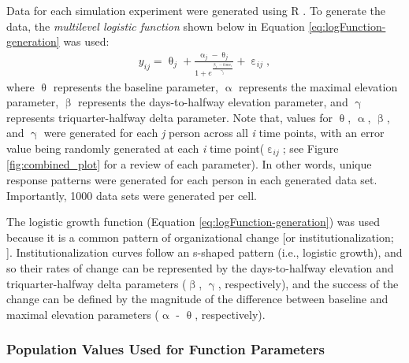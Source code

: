\documentclass[
12pt, %
twoside,
english]{guelphthesis}
\begin{document}
Data for each simulation experiment were generated using R \autocite{rstudio}. To generate the data, the \emph{multilevel logistic function} shown below in Equation \eqref{eq:logFunction-generation} was used:
\begin{align}
  y_{ij} = \uptheta_j + \frac{\upalpha_j - \uptheta_j}{{1 + e^\frac{\upbeta_j - time_i}{\upgamma_j}}} + \upepsilon_{ij}, 
\label{eq:logFunction-generation}
\end{align}
\noindent where \(\uptheta\) represents the baseline parameter, \(\upalpha\) represents the maximal elevation parameter, \(\upbeta\) represents the days-to-halfway elevation parameter, and \(\upgamma\) represents triquarter-halfway delta parameter. Note that, values for \(\uptheta\), \(\upalpha\), \(\upbeta\), and \(\upgamma\) were generated for each \emph{j} person across all \emph{i} time points, with an error value being randomly generated at each \emph{i} time point(\(\upepsilon_{ij}\); see Figure \ref{fig:combined_plot} for a review of each parameter). In other words, unique response patterns were generated for each person in each generated data set. Importantly, 1000 data sets were generated per cell.

The logistic growth function (Equation \ref{eq:logFunction-generation}) was used because it is a common pattern of organizational change {[}or institutionalization; \textcite{lawrence2001}{]}. Institutionalization curves follow an s-shaped pattern (i.e., logistic growth), and so their rates of change can be represented by the days-to-halfway elevation and triquarter-halfway delta parameters (\(\upbeta\), \(\upgamma\), respectively), and the success of the change can be defined by the magnitude of the difference between baseline and maximal elevation parameters (\(\upalpha\) - \(\uptheta\), respectively).

\hypertarget{population-values-used-for-function-parameters}{%
\subsubsection{Population Values Used for Function Parameters}\label{population-values-used-for-function-parameters}}
\end{document}
